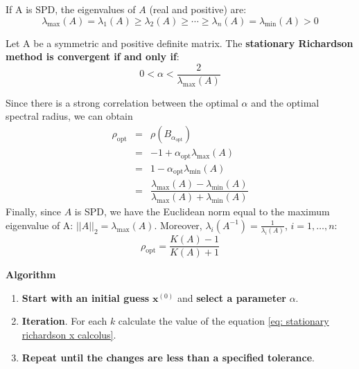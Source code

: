 \noindent
If A is SPD, the eigenvalues of $A$ (real and positive) are:
\begin{equation*}
    \lambda_{\max}\left(A\right) = \lambda_{1}\left(A\right) \ge \lambda_{2}\left(A\right) \ge \cdots \ge \lambda_{n}\left(A\right) = \lambda_{\min}\left(A\right) > 0
\end{equation*}
\begin{theorem}
    Let A be a symmetric and positive definite matrix. The \textbf{stationary Richardson method is convergent if and only if}:
    \begin{equation}
        0 < \alpha < \dfrac{2}{\lambda_{\max}\left(A\right)}
    \end{equation}
\end{theorem}

\noindent
Since there is a strong correlation between the optimal $\alpha$ and the optimal spectral radius, we can obtain
\begin{equation*}
    \begin{array}{rcl}
        \rho_{\text{opt}} &=& \rho\left(B_{\alpha_{\text{opt}}}\right) \\ [.3em]
        &=& -1+\alpha_{\text{opt}}\lambda_{\max}\left(A\right) \\ [.3em]
        &=& 1-\alpha_{\text{opt}}\lambda_{\min}\left(A\right) \\ [.3em]
        &=& \dfrac{
            \lambda_{\max}\left(A\right) - \lambda_{\min}\left(A\right)
        }{
            \lambda_{\max}\left(A\right) + \lambda_{\min}\left(A\right)
        }
    \end{array}
\end{equation*}
Finally, since $A$ is SPD, we have the Euclidean norm equal to the maximum eigenvalue of A: ${\left|\left|A\right|\right|}_{2} = \lambda_{\max}\left(A\right)$. Moreover, $\lambda_{i}\left(A^{-1}\right) = \frac{1}{\lambda_{i}\left(A\right)}$, $i = 1, \dots, n$:
\begin{equation}\label{eq: optimal sepctral radius}
    \rho_{\text{opt}} = \dfrac{
        K\left(A\right)-1
    }{
        K\left(A\right)+1
    }
\end{equation}

\begin{flushleft}
    \textcolor{Green3}{ \textbf{Algorithm}}
\end{flushleft}
\begin{enumerate}
    \item \textbf{Start with an initial guess} $\mathbf{x}^{\left(0\right)}$ and \textbf{select a parameter} $\alpha$.
    \item \textbf{Iteration}. For each $k$ calculate the value of the equation \ref{eq: stationary richardson x calcolus}.
    \item \textbf{Repeat until the changes are less than a specified tolerance}.
\end{enumerate}

